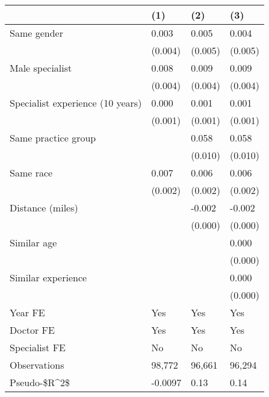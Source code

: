 \begin{tabular}{llll}
\hline
& (1) & (2) & (3) \\ \hline
Same gender                        & 0.003   & 0.005   & 0.004   \\
& (0.004) & (0.005) & (0.005) \\
Male specialist                    & 0.008   & 0.009   & 0.009   \\
& (0.004) & (0.004) & (0.004) \\
Specialist experience (10 years)   & 0.000   & 0.001   & 0.001   \\
& (0.001) & (0.001) & (0.001) \\
Same practice group                &         & 0.058   & 0.058   \\
&         & (0.010) & (0.010) \\
Same race                          & 0.007   & 0.006   & 0.006   \\
& (0.002) & (0.002) & (0.002) \\
Distance (miles)                   &         & -0.002  & -0.002  \\
&         & (0.000) & (0.000) \\
Similar age                        &         &         & 0.000   \\
&         &         & (0.000) \\
Similar experience                 &         &         & 0.000   \\
&         &         & (0.000) \\
Year FE                            & Yes     & Yes     & Yes     \\
Doctor FE                          & Yes     & Yes     & Yes     \\
Specialist FE                      & No      & No      & No      \\
Observations                       & 98,772  & 96,661  & 96,294  \\
Pseudo-\$R\textasciicircum{}2\$ & -0.0097 & 0.13    & 0.14    \\
\hline
\end{tabular}
